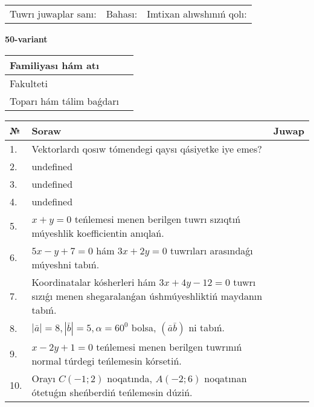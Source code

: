 \documentclass{article}
\begin{document}
\vspace{0.7cm}

\begin{tabular}{lll}
Tuwrı juwaplar sanı: \underline{\hspace{1cm}} & 
Bahası: \underline{\hspace{1cm}} & 
Imtixan alıwshınıń qolı: \underline{\hspace{2cm}} \\
\end{tabular}

\egroup

\newpage


\textbf{50-variant}\\

\bgroup
\def\arraystretch{1.6} %

\begin{tabular}{|m{5.7cm}|m{9.5cm}|}
\hline
Familiyası hám atı & \\
\hline
Fakulteti  & \\
\hline
Toparı hám tálim baǵdarı  & \\
\hline
\end{tabular}

\vspace{0.7cm}

\begin{tabular}{|m{0.7cm}|m{10cm}|m{4cm}|}
\hline
№ & Soraw & Juwap \\
\hline
1. & Vektorlardı qosıw tómendegi qaysı qásiyetke iye emes? &  \\
\hline
2. & undefined &  \\
\hline
3. & undefined &  \\
\hline
4. & undefined &  \\
\hline
5. & \(x + y = 0\) teńlemesi menen berilgen tuwrı sızıqtıń múyeshlik koefficientin anıqlań. &  \\
\hline
6. & \(5 x - y + 7 = 0\) hám \(3 x + 2 y = 0\) tuwrıları arasındaǵı múyeshni tabıń. &  \\
\hline
7. & Koordinatalar kósherleri hám \( 3 x + 4 y - 12 = 0 \) tuwrı sızıǵı menen shegaralanǵan úshmúyeshliktiń maydanın tabıń. &  \\
\hline
8. & \(\left| \bar{a} \right| = 8, \left| \bar{b} \right| = 5, \alpha = 60^{0}\) bolsa, \(( \bar{a}\bar{b} )\) ni tabıń. &  \\
\hline
9. & \(x - 2 y + 1 = 0\) teńlemesi menen berilgen tuwrınıń normal túrdegi teńlemesin kórsetiń. &  \\
\hline
10. & Orayı \(C (- 1;2)\) noqatında, \(A (- 2;6 )\) noqatınan ótetuǵın sheńberdiń teńlemesin dúziń. & \\
\hline
\end{tabular}
\end{document}
